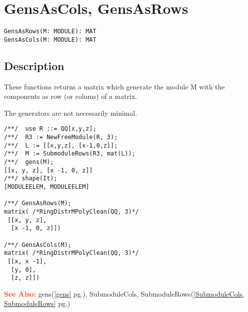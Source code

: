 \documentclass[a4paper]{mybook}
\newenvironment{command}{}{} %
\newcommand\SeeAlso{\par\textcolor{OrangeRed}{\textbf{\large See Also: }}}
\begin{document}
\section{GensAsCols, GensAsRows}
\label{GensAsCols, GensAsRows}
\begin{command} %


\begin{Verbatim}[label=syntax, rulecolor=\color{MidnightBlue},
frame=single]
GensAsRows(M: MODULE): MAT
GensAsCols(M: MODULE): MAT
\end{Verbatim}


\subsection*{Description}

These functions returns a matrix which generate the module M
with the components as row (or colums) of a matrix.
\par 
The generators are not necessarily minimal.
\begin{Verbatim}[label=example, rulecolor=\color{PineGreen}, frame=single]
/**/  use R ::= QQ[x,y,z];
/**/  R3 := NewFreeModule(R, 3);
/**/  L := [[x,y,z], [x-1,0,z]];
/**/  M := SubmoduleRows(R3, mat(L));
/**/  gens(M);
[[x, y, z], [x -1, 0, z]]
/**/ shape(It);
[MODULEELEM, MODULEELEM]

/**/ GensAsRows(M);
matrix( /*RingDistrMPolyClean(QQ, 3)*/
 [[x, y, z],
  [x -1, 0, z]])

/**/ GensAsCols(M);
matrix( /*RingDistrMPolyClean(QQ, 3)*/
 [[x, x -1],
  [y, 0],
  [z, z]])
\end{Verbatim}


\SeeAlso %
  gens(\ref{gens} pg.\pageref{gens}), 
    SubmoduleCols, SubmoduleRows(\ref{SubmoduleCols, SubmoduleRows} pg.\pageref{SubmoduleCols, SubmoduleRows})
\end{command} %
\end{document}
